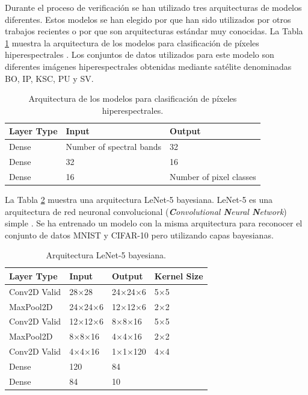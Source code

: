 Durante el proceso de verificación se han utilizado tres arquitecturas de modelos diferentes. Estos modelos se han elegido por que han sido utilizados por otros trabajos recientes o por que son arquitecturas estándar muy conocidas. La Tabla \ref{tab:hyper_models} muestra la arquitectura de los modelos para clasificación de píxeles hiperespectrales \cite{bnn_hyper_uncertainty}. Los conjuntos de datos utilizados para este modelo son diferentes imágenes hiperespectrales obtenidas mediante satélite denominadas BO, IP, KSC, PU y SV.


\begin{table}[h]
	\centering
	\caption{Arquitectura de los modelos para clasificación de píxeles hiperespectrales.}
	\label{tab:hyper_models}
	\begin{tabular}{lll}
	\hline
     	\textbf{Layer Type} & \textbf{Input} & \textbf{Output}\\ \hline
     	Dense & Number of spectral bands & 32\\
     	Dense & 32 & 16\\
     	Dense & 16 & Number of pixel classes\\ \hline
	\end{tabular}
\end{table}

La Tabla \ref{tab:cnn_models} muestra una arquitectura LeNet-5 bayesiana. LeNet-5 es una arquitectura de red neuronal convolucional (\textit{\textbf{C}onvolutional \textbf{N}eural \textbf{N}etwork}) simple \cite{lenet}. Se ha entrenado un modelo con la misma arquitectura para reconocer el conjunto de datos MNIST \cite{MNIST_dataset} y CIFAR-10 \cite{CIFAR_dataset} pero utilizando capas bayesianas.

\begin{table}[h]
	\centering
	\caption{Arquitectura LeNet-5 bayesiana.}
	\label{tab:cnn_models}
	\begin{tabular}{llll}
    	\hline
     	\textbf{Layer Type} &  \textbf{Input} &  \textbf{Output} & \textbf{Kernel Size} \\ \hline
     	Conv2D Valid & 28$\times$28 & 24$\times$24$\times$6 & 5$\times$5 \\
     	MaxPool2D & 24$\times$24$\times$6 & 12$\times$12$\times$6 & 2$\times$2 \\
     	Conv2D Valid & 12$\times$12$\times$6 & 8$\times$8$\times$16 & 5$\times$5 \\
     	MaxPool2D & 8$\times$8$\times$16 & 4$\times$4$\times$16 & 2$\times$2 \\
     	Conv2D Valid & 4$\times$4$\times$16 & 1$\times$1$\times$120 & 4$\times$4 \\
     	Dense & 120 & 84 & \\
     	Dense & 84 & 10 & \\ \hline
	\end{tabular}
\end{table}

